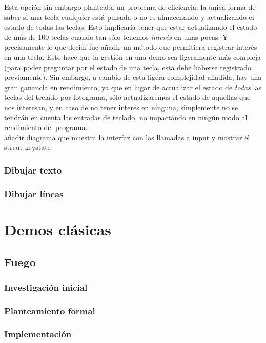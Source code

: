Esta opción sin embargo planteaba un problema de eficiencia: la única forma de saber si una tecla cualquier está pulsada o no es almacenando y actualizando el estado de todas las teclas. Esto implicaría tener que estar actualizando el estado de más de 100 teclas cuando tan sólo tenemos \emph{interés} en unas pocas. Y precisamente lo que decidí fue añadir un método que permitiera registrar interés en una tecla. Esto hace que la gestión en una demo sea ligeramente más compleja (para poder preguntar por el estado de una tecla, esta debe haberse registrado previamente). Sin embargo, a cambio de esta ligera complejidad añadida, hay una gran ganancia en rendimiento, ya que en lugar de actualizar el estado de \emph{todas} las teclas del teclado por fotograma, sólo actualizaremos el estado de aquellas que nos interesan, y en caso de no tener interés en ninguna, simplemente no se tendrán en cuenta las entradas de teclado, no impactando en ningún modo al rendimiento del programa.\\

añadir diagrama que muestra la interfaz con las llamadas a input y mostrar el strcut keystate

\subsection{Dibujar texto}
\subsection{Dibujar líneas}

\chapter{Demos clásicas}

\section{Fuego}

\subsection{Investigación inicial}
\subsection{Planteamiento formal}
\subsection{Implementación}
